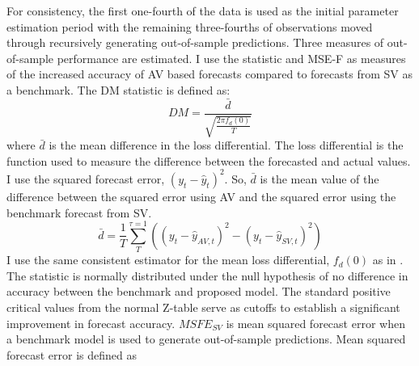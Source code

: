 For consistency, the first one-fourth of the data is used as the initial parameter estimation period with the remaining three-fourths of observations moved through recursively generating out-of-sample predictions. Three measures of out-of-sample performance are estimated.
I use the \citet{Diebold1995} statistic and \citet{mccracken_asymptotics_2007} MSE-F as measures of the increased accuracy of AV based forecasts compared to forecasts from SV as a benchmark. The DM statistic is defined as:
\begin{equation}
	DM = \frac{\bar{d}}{\sqrt{\frac{2\pi f_{d}(0)}{T}}}
\end{equation}
where $\bar{d}$ is the mean difference in the loss differential. The loss differential is the function used to measure the difference between the forecasted and actual values. I use the squared forecast error, $(y_{t} - \hat{y}_{t})^{2}$. So, $\bar{d}$ is the mean value of the difference between the squared error using AV and the squared error using the benchmark forecast from SV.
\begin{equation}
	\bar{d} = \frac{1}{T}\sum_{T}^{\tau=1}((y_{t} - \hat{y}_{AV,t})^{2} - (y_{t} - \hat{y}_{SV,t})^{2})
\end{equation}
I use the same consistent estimator for the mean loss differential, $f_{d}(0)$ as in \citet{Diebold1995}. The statistic is normally distributed under the null hypothesis of no difference in accuracy between the benchmark and proposed model. The standard positive critical values from the normal Z-table serve as cutoffs to establish a significant improvement in forecast accuracy. $MSFE_{SV}$ is mean squared forecast error when a benchmark model is used to generate out-of-sample predictions. Mean squared forecast error is defined as
